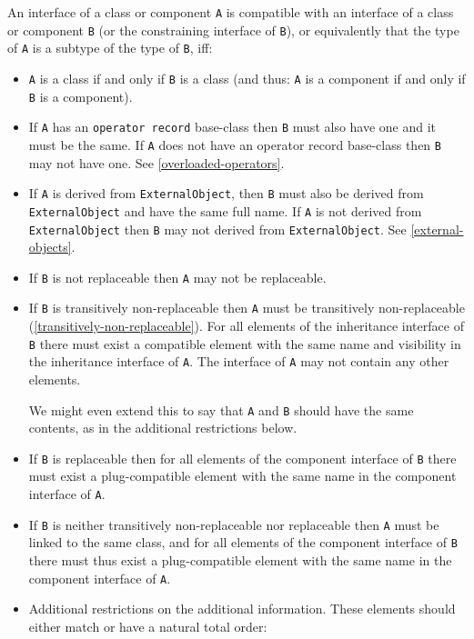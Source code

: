 An interface of a class or component \lstinline!A! is compatible with an interface
of a class or component \lstinline!B! (or the constraining interface of \lstinline!B!), or
equivalently that the type of \lstinline!A! is a subtype of the type of \lstinline!B!, iff:
\begin{itemize}
\item
  \lstinline!A! is a class if and only if \lstinline!B! is a class (and thus: \lstinline!A! is a component
  if and only if \lstinline!B! is a component).
\item
  If \lstinline!A! has an \lstinline!operator record! base-class then \lstinline!B! must also have one and
  it must be the same. If \lstinline!A! does not have an operator record base-class
  then \lstinline!B! may not have one. See \autoref{overloaded-operators}.
\item
  If \lstinline!A! is derived from \lstinline!ExternalObject!, then \lstinline!B! must also be derived from
  \lstinline!ExternalObject! and have the same full name. If \lstinline!A! is not derived from
  \lstinline!ExternalObject! then \lstinline!B! may not derived from \lstinline!ExternalObject!. See
  \autoref{external-objects}.
\item
  If \lstinline!B! is not replaceable then \lstinline!A! may not be replaceable.
\item
  If \lstinline!B! is transitively non-replaceable then \lstinline!A! must be transitively
  non-replaceable (\autoref{transitively-non-replaceable}). For all elements of the inheritance
  interface of \lstinline!B! there must exist a compatible element with the same
  name and visibility in the inheritance interface of \lstinline!A!. The interface
  of \lstinline!A! may not contain any other elements.
  \begin{nonnormative}
  We might even extend this to say that \lstinline!A! and \lstinline!B! should have the same contents, as in the additional restrictions below.
  \end{nonnormative}
\item
  If \lstinline!B! is replaceable then for all elements of the component interface
  of \lstinline!B! there must exist a plug-compatible element with the same name in
  the component interface of \lstinline!A!.
\item
  If \lstinline!B! is neither transitively non-replaceable nor replaceable then \lstinline!A!
  must be linked to the same class, and for all elements of the
  component interface of \lstinline!B! there must thus exist a plug-compatible
  element with the same name in the component interface of \lstinline!A!.
\item
  Additional restrictions on the additional information. These elements
  should either match or have a natural total order:


\end{itemize}
